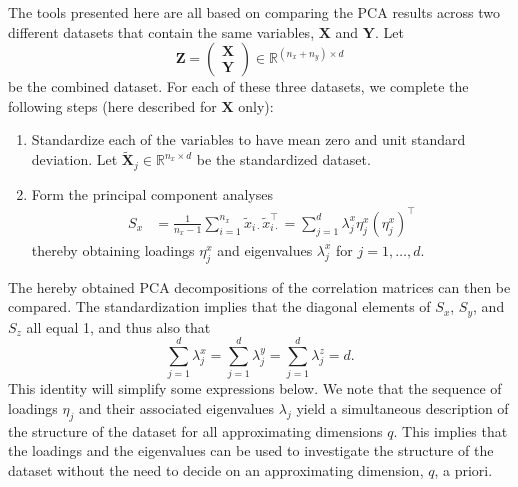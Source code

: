 \documentclass[]{interact}
\theoremstyle{plain}%
\theoremstyle{definition}
\theoremstyle{remark}
\newcommand{\RR}{\mathbb{R}}
\begin{document}
The tools presented here are all based on comparing the PCA results across two different datasets that contain the same variables, $\mathbf{X}$ and $\mathbf{Y}$. Let 
\begin{equation*}
\mathbf{Z} = \begin{pmatrix} \mathbf{X} \\ \mathbf{Y} \end{pmatrix} \in \RR^{(n_x + n_y) \times d}
\end{equation*}
 be the combined dataset. For each of these three datasets, we complete the following steps (here described for $\mathbf{X}$ only):
\begin{enumerate}
\item Standardize each of the variables to have mean zero and unit standard deviation. Let $\tilde{\mathbf{X}}_{j} \in \RR^{n_x \times d}$ be the standardized dataset.
\item Form the principal component analyses
\begin{align*}
S_x &= \frac{1}{n_x-1} \sum_{i=1}^{n_x} \tilde{x}_{i \cdot} \tilde{x}_{i \cdot}^\top = \sum_{j=1}^d \lambda_{j}^x \eta_{j}^x ({\eta_{j}^x})^\top 
\end{align*}
thereby obtaining loadings $\eta_{j}^x$ and eigenvalues $\lambda^x_j$ for $j=1,\dotsc,d$.
\end{enumerate}
The hereby obtained PCA decompositions of the correlation matrices can then be compared. The standardization implies that the diagonal elements of $S_x$, $S_y$, and $S_z$ all equal 1, and thus also that
\begin{equation*}
\sum_{j=1}^d \lambda_j^x = \sum_{j=1}^d \lambda_{j}^y = \sum_{j=1}^d \lambda_{j}^z =  d.
\end{equation*}
This identity will simplify some expressions below. We note that the sequence of loadings $\eta_j$ and their associated eigenvalues $\lambda_j$ yield a simultaneous description of the structure of the dataset for all approximating dimensions $q$. This implies that the loadings and the eigenvalues can be used to investigate the structure of the dataset without the need to decide on an approximating dimension, $q$, a priori. 
\end{document}

